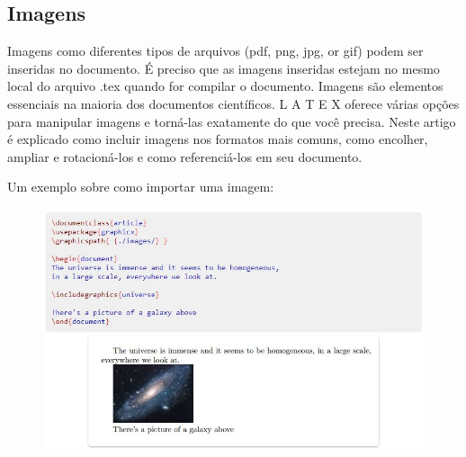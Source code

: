 \documentclass[12pt]{article}
\begin{document}
		\subsection{Imagens}
			Imagens como diferentes tipos de arquivos (pdf, png, jpg, or gif) podem ser inseridas no documento. É preciso que as imagens inseridas estejam no mesmo local do arquivo .tex quando for compilar o documento. 
			Imagens são elementos essenciais na maioria dos documentos científicos. L A T E X oferece várias opções para manipular imagens e torná-las exatamente do que você precisa. Neste artigo é explicado como incluir imagens nos formatos mais comuns, como encolher, ampliar e rotacioná-los e como referenciá-los em seu documento.
			
			Um exemplo sobre como importar uma imagem:
			\begin{figure} [h]
				\centering
				\includegraphics[scale=0.9]{21.JPG}
			\end{figure}
			
\end{document}
